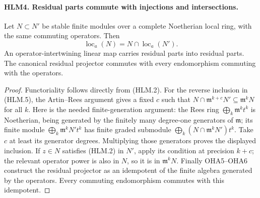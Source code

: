 \documentclass[11pt,a4paper]{article}
\numberwithin{equation}{section}
\theoremstyle{remark}\newtheorem{remark}[theorem]{Remark}
\begin{document}
\paragraph{HLM4. Residual parts commute with injections and intersections.}
\label{claim:HLM4}
Let \(N\subset N'\) be stable finite modules over a complete
Noetherian local ring, with the same commuting operators.
Then
\[
       \operatorname{loc}_a(N)=N\cap\operatorname{loc}_a(N').
 \tag{HLM.5}
\]
An operator-intertwining linear map carries residual parts into
residual parts.  The canonical residual projector commutes with
every endomorphism commuting with the operators.
\begin{proof}
Functoriality follows directly from (HLM.2).  For the reverse
inclusion in (HLM.5), the Artin--Rees argument gives a fixed
\(c\) such that
\(N\cap\mathfrak m^{k+c}N'\subseteq\mathfrak m^kN\)
for all \(k\).  Here is the needed finite-generation argument:
the Rees ring \(\bigoplus_k\mathfrak m^kt^k\) is Noetherian,
being generated by the finitely many degree-one generators of
\(\mathfrak m\); its finite module
\(\bigoplus_k\mathfrak m^kN't^k\) has finite graded submodule
\(\bigoplus_k(N\cap\mathfrak m^kN')t^k\).
Take \(c\) at least its generator degrees.  Multiplying those
generators proves the displayed inclusion.  If \(z\in N\)
satisfies (HLM.2) in \(N'\), apply its condition at precision
\(k+c\); the relevant operator power is also in \(N\),
so it is in \(\mathfrak m^kN\).
Finally OHA5--OHA6 construct the residual projector as an
idempotent of the finite algebra generated by the operators.
Every commuting endomorphism commutes with this idempotent.
\end{proof}

\end{document}
